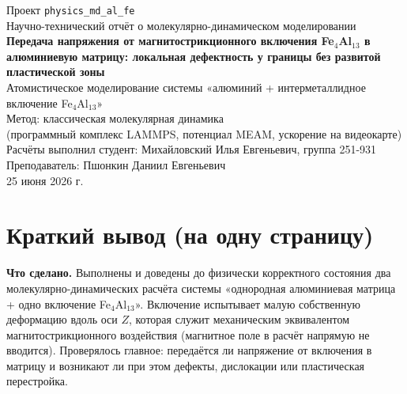 \documentclass[12pt,a4paper]{extarticle}
\newcommand{\code}[1]{\texttt{#1}}
\begin{document}
\thispagestyle{empty}
\begin{center}
\vspace*{1.8cm}
{\large Проект \code{physics\_md\_al\_fe}}\\[0.3cm]
{\large Научно-технический отчёт о молекулярно-динамическом моделировании}\\[2.0cm]

{\LARGE\bfseries Передача напряжения от магнитострикционного включения Fe$_4$Al$_{13}$ в алюминиевую матрицу: локальная дефектность у границы без развитой пластической зоны}\\[2.0cm]

{\large Атомистическое моделирование системы «алюминий + интерметаллидное включение Fe$_4$Al$_{13}$»}\\[1.4cm]

{\large Метод: классическая молекулярная динамика\\(программный комплекс LAMMPS, потенциал MEAM, ускорение на видеокарте)}\\[2.4cm]

\vfill
{\large Расчёты выполнил студент: Михайловский Илья Евгеньевич, группа 251-931}\\[0.4cm]
{\large Преподаватель: Пшонкин Даниил Евгеньевич}\\[0.8cm]
{\large 25 июня 2026 г.}
\end{center}
\newpage

\tableofcontents
\newpage

\section{Краткий вывод (на одну страницу)}

\noindent\textbf{Что сделано.} Выполнены и доведены до физически корректного состояния два молекулярно-динамических расчёта системы «однородная алюминиевая матрица + одно включение Fe$_4$Al$_{13}$». Включение испытывает малую собственную деформацию вдоль оси $Z$, которая служит механическим эквивалентом магнитострикционного воздействия (магнитное поле в расчёт напрямую не вводится). Проверялось главное: передаётся ли напряжение от включения в матрицу и возникают ли при этом дефекты, дислокации или пластическая перестройка.
\end{document}
